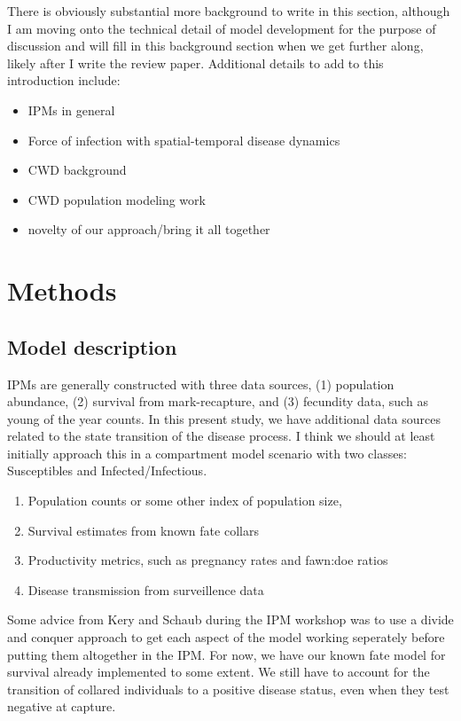\documentclass[12pt]{article}\usepackage[]{graphicx}\usepackage[]{color}
\begin{document}
There is obviously substantial more background to write in this section, although I am moving onto the technical detail of model development for the purpose of discussion and will fill in this background section when we get further along, likely after I write the review paper. Additional details to add to this introduction include:
\begin{itemize}
\item IPMs in general
\item Force of infection with spatial-temporal disease dynamics
\item CWD background
\item CWD population modeling work
\item novelty of our approach/bring it all together
\end{itemize}
 

\section{Methods}

\subsection{Model description}

IPMs are generally constructed with three data sources, (1) population abundance, (2) survival from mark-recapture, and  (3) fecundity data, such as young of the year counts. In this present study, we have additional data sources related to the state transition of the disease process. I think we should at least initially approach this in a compartment model scenario with two classes: Susceptibles and Infected/Infectious.
\begin{enumerate}
\item Population counts or some other index of population size, 
\item Survival estimates from known fate collars 
\item Productivity metrics, such as pregnancy rates and fawn:doe ratios
\item Disease transmission from surveillence data
\end{enumerate}

Some advice from Kery and Schaub during the IPM workshop was to use a divide and conquer approach to get each aspect of the model working seperately before putting them altogether in the IPM. For now, we have our known fate model for survival already implemented to some extent. We still have to account for the transition of collared individuals to a positive disease status, even when they test negative at capture. 
\end{document}
